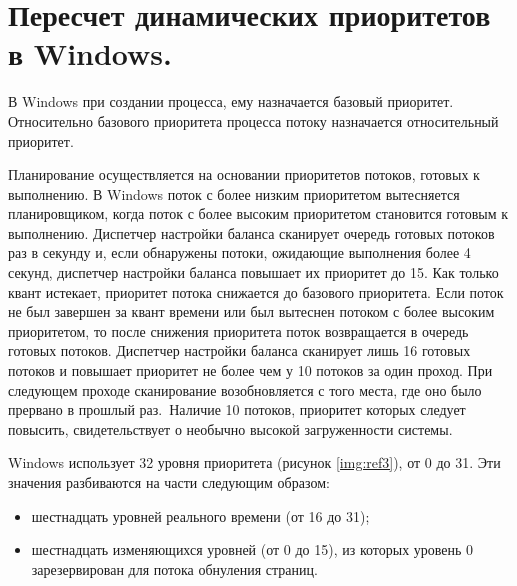 \section{Пересчет динамических приоритетов в Windows.}

В Windows при создании процесса, ему назначается базовый приоритет.
Относительно базового приоритета процесса потоку назначается относительный приоритет.

Планирование осуществляется на основании приоритетов потоков, готовых к выполнению.
В Windows поток с более низким приоритетом вытесняется планировщиком, когда поток 
с более высоким приоритетом становится готовым к выполнению.
Диспетчер настройки баланса сканирует очередь готовых потоков раз в секунду и,
если обнаружены потоки, ожидающие выполнения более 4
секунд, диспетчер настройки баланса повышает их приоритет до 15. 
Как только квант истекает, приоритет потока снижается до базового приоритета.
Если поток не был завершен за квант времени или был вытеснен потоком с более высоким приоритетом, то после снижения приоритета поток
возвращается в очередь готовых потоков. 
Диспетчер настройки баланса сканирует лишь 16 готовых потоков
и повышает приоритет не более чем у 10 потоков за один проход.
При следующем проходе сканирование возобновляется
с того места, где оно было прервано в прошлый раз.\
Наличие 10 потоков, приоритет которых следует повысить,
свидетельствует о необычно высокой загруженности системы.

Windows использует 32 уровня приоритета (рисунок \ref{img:ref3}), от 0 до 31. Эти значения
разбиваются на части следующим образом:

\begin{itemize}
	\item шестнадцать уровней реального времени (от 16 до 31);
	\item шестнадцать изменяющихся уровней (от 0 до 15), из которых 
	уровень 0 зарезервирован для потока обнуления страниц.
\end{itemize}


\begin{figure}[ht!]
\end{figure}


